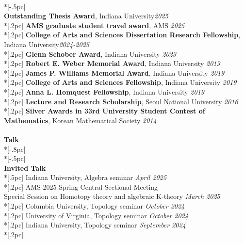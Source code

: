 \documentclass{article}
\begin{document}
\underline{\hspace{6.5in}} \\*[-.5pc]
\\
{\bf Outstanding Thesis Award},  Indiana University\hfill {\it  2025\/} \\*[.2pc]
{\bf AMS graduate student travel award}, AMS \hfill {\it 2025\/} \\*[.2pc]
{\bf College of Arts and Sciences Dissertation Research Fellowship}, Indiana University\hfill {\it 2024-2025\/} \\*[.2pc]
{\bf Glenn Schober Award}, Indiana University \hfill {\it  2023\/} \\*[.2pc]
{\bf Robert E. Weber Memorial Award}, Indiana University \hfill {\it  2019\/} \\*[.2pc]
{\bf James P. Williams Memorial Award}, Indiana University \hfill {\it  2019\/} \\*[.2pc]
{\bf College of Arts and Sciences Fellowship}, Indiana University \hfill {\it  2019\/} \\*[.2pc]
{\bf Anna L. Homquest Fellowship}, Indiana University \hfill {\it  2019\/} \\*[.2pc]
{\bf Lecture and Research Scholarship}, Seoul National University \hfill {\it  2016\/} \\*[.2pc]
{\bf Silver Awards in 33rd University Student Contest of Mathematics}, Korean Mathematical Society \hfill {\it  2014\/}  \\
\\
{\Large \bf Talk} \\*[-.8pc]
\underline{\hspace{6.5in}} \\*[-.5pc]
\\
{\bf  \large Invited Talk} \\*[.5pc]
{ Indiana University, Algebra seminar} \hfill {\it April 2025\/}  \\*[.2pc]
{  AMS 2025 Spring Central Sectional Meeting \\ \hspace*{1em} Special Session on Homotopy theory and algebraic K-theory} \hfill {\it March 2025\/}  \\*[.2pc]
{  Columbia University, Topology seminar} \hfill {\it October 2024\/}  \\*[.2pc]
{  University of Virginia, Topology seminar} \hfill {\it October 2024\/}  \\*[.2pc]
{ Indiana University, Topology seminar} \hfill {\it September 2024\/}  \\*[.2pc]
\end{document}
